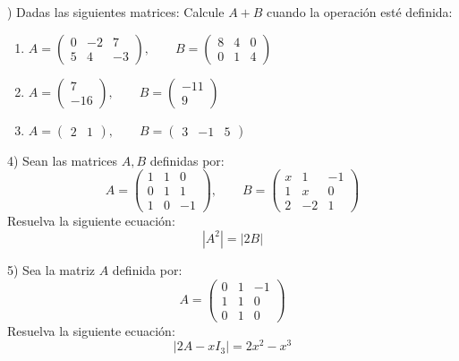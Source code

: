 \documentclass[letterpaper, 12pt]{article}
\newenvironment{ejercicios}{}{}
\begin{document}
\begin{ejercicios}
3) Dadas las siguientes matrices:
Calcule $A+B$ cuando la operación esté definida:
\begin{enumerate}[label=\alph*), leftmargin=1.5cm, itemsep=0.8em]
    \item[\textbf{b)}] $A = \begin{pmatrix} 0 & -2 & 7 \\ 5 & 4 & -3 \end{pmatrix}, \qquad B = \begin{pmatrix} 8 & 4 & 0 \\ 0 & 1 & 4 \end{pmatrix}$
    \item[\textbf{c)}] $A = \begin{pmatrix} 7 \\ -16 \end{pmatrix}, \qquad B = \begin{pmatrix} -11 \\ 9 \end{pmatrix}$
    \item[\textbf{d)}] $A = \begin{pmatrix} 2 & 1 \end{pmatrix}, \qquad B = \begin{pmatrix} 3 & -1 & 5 \end{pmatrix}$
\end{enumerate}

\vspace{0.5cm}

4) Sean las matrices $A, B$ definidas por:
$$ A = \begin{pmatrix} 1 & 1 & 0 \\ 0 & 1 & 1 \\ 1 & 0 & -1 \end{pmatrix}, \qquad B = \begin{pmatrix} x & 1 & -1 \\ 1 & x & 0 \\ 2 & -2 & 1 \end{pmatrix} $$
Resuelva la siguiente ecuación:
$$ |A^2| = |2B| $$

\vspace{0.5cm}

\newpage
\thispagestyle{fancy}
5) Sea la matriz $A$ definida por:
$$ A = \begin{pmatrix} 0 & 1 & -1 \\ 1 & 1 & 0 \\ 0 & 1 & 0 \end{pmatrix} $$
Resuelva la siguiente ecuación:
$$ |2A - xI_3| = 2x^2 - x^3 $$


\end{ejercicios}
\end{document}
